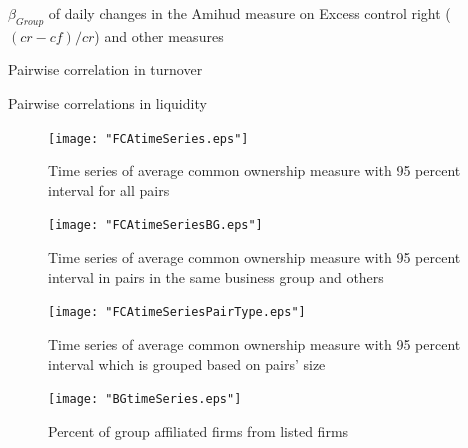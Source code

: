 \documentclass[12pt, a4paper]{article}
\begin{document}
	\begin{table}[htbp]
	\centering
	\caption{$ \beta_{Group} $ of daily changes in the Amihud measure  on Excess control right ($ (cr - cf)/cr $) and other measures   }
	\resizebox{0.7\textheight}{!}{
		\centering
		
	}
\label{Amihudcrosssection}
\end{table}

\begin{table}[htbp]
	\centering
	\caption{Pairwise correlation in turnover  }
	\resizebox{0.7\textheight}{!}{
		\centering
		
	}
	\label{mresult2-turnover}
\end{table}

\begin{table}[htbp]
	\centering
	\caption{Pairwise correlations in liquidity}
	\resizebox{0.7\textheight}{!}{
		\centering
		
	}
	\label{mresult2-liquidity}
	\end{table}



\newpage
		\begin{figure}
	\centering  
	\caption{Time series of average common ownership measure with 95 percent interval for all pairs}
	\texttt{[image: "FCAtimeSeries.eps"]}
	
\end{figure} 

			\begin{figure}
	\centering  
	\caption{Time series of average common ownership measure with 95 percent interval in pairs in the same business group and others}
	\texttt{[image: "FCAtimeSeriesBG.eps"]}
\end{figure}    

\begin{figure}
	\centering  
	\caption{Time series of average common ownership measure with 95 percent interval which is grouped based on pairs' size}
	\texttt{[image: "FCAtimeSeriesPairType.eps"]}
\end{figure}




	\begin{figure}
	\centering  
	\caption{Percent of group affiliated firms from listed firms}
	\texttt{[image: "BGtimeSeries.eps"]}
	
\end{figure}  
\end{document}
